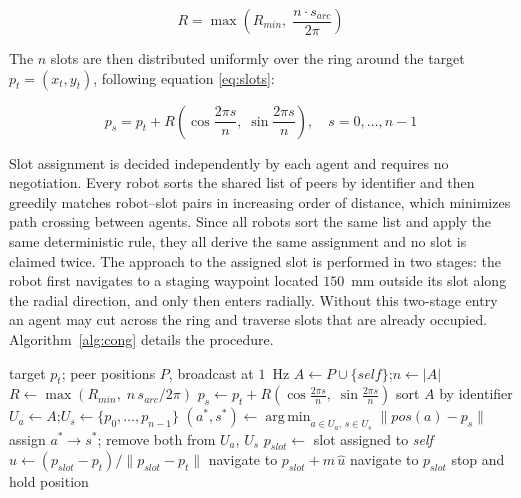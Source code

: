 \documentclass[conference]{IEEEtran}
\begin{document}
\begin{equation}
R = \max \left( R_{min},\; \frac{n \cdot s_{arc}}{2\pi} \right)
\label{eq:ring}
\end{equation}

The $n$ slots are then distributed uniformly over the ring around the target
$p_{t} = (x_t, y_t)$, following equation \ref{eq:slots}:

\begin{equation}
p_{s} = p_{t} + R \left( \cos \frac{2\pi s}{n},\; \sin \frac{2\pi s}{n} \right),
\quad s = 0, \ldots, n-1
\label{eq:slots}
\end{equation}

Slot assignment is decided independently by each agent and requires no
negotiation. Every robot sorts the shared list of peers by identifier and then
greedily matches robot--slot pairs in increasing order of distance, which
minimizes path crossing between agents. Since all robots sort the same list and
apply the same deterministic rule, they all derive the same assignment and no
slot is claimed twice. The approach to the assigned slot is performed in two
stages: the robot first navigates to a staging waypoint located $150$~mm outside
its slot along the radial direction, and only then enters radially. Without this
two-stage entry an agent may cut across the ring and traverse slots that are
already occupied. Algorithm~\ref{alg:cong} details the procedure.

\begin{algorithm}
\caption{Leaderless congregation on a target point}
\label{alg:cong}
\begin{algorithmic}[1]
\REQUIRE target $p_t$; peer positions $P$, broadcast at $1$~Hz
\STATE $A \leftarrow P \cup \{\textit{self}\}$;\quad $n \leftarrow \lvert A \rvert$
\STATE $R \leftarrow \max \left( R_{min},\; n \, s_{arc} / 2\pi \right)$
    \STATE $p_s \leftarrow p_t + R \left( \cos \tfrac{2\pi s}{n},\;
           \sin \tfrac{2\pi s}{n} \right)$
\ENDFOR
\STATE sort $A$ by identifier
\STATE $U_a \leftarrow A$;\quad $U_s \leftarrow \{p_0, \ldots, p_{n-1}\}$
    \STATE $(a^{*}, s^{*}) \leftarrow
           \operatorname*{arg\,min}_{a \in U_a,\, s \in U_s}
           \lVert \textit{pos}(a) - p_s \rVert$
    \STATE assign $a^{*} \rightarrow s^{*}$; remove both from $U_a$, $U_s$
\ENDWHILE
\STATE $p_{slot} \leftarrow$ slot assigned to \textit{self}
\STATE $\hat{u} \leftarrow (p_{slot} - p_t) / \lVert p_{slot} - p_t \rVert$
\STATE navigate to $p_{slot} + m \, \hat{u}$
\STATE navigate to $p_{slot}$
\STATE stop and hold position
\end{algorithmic}
\end{algorithm}
\end{document}
